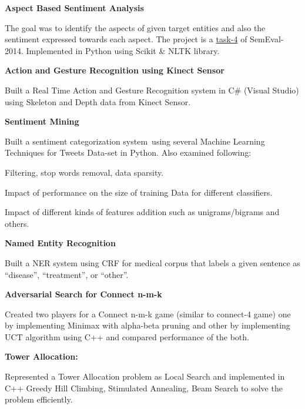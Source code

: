\documentclass[10pt]{article} %
\begin{document}
\begin{itemize}
	
	{\item  \bf Aspect Based Sentiment Analysis\\} The goal was to identify the aspects of given target entities and also the 		sentiment 		expressed towards each aspect. The project is a \href {http://alt.qcri.org/semeval2014/task4/}{task-4} of SemEval-2014. Implemented in Python using Scikit \& NLTK library. 
	

	{\item  \bf Action and Gesture Recognition using Kinect Sensor\\}	
	Built a Real Time Action and Gesture Recognition system in C\# (Visual Studio) using Skeleton and Depth data from Kinect Sensor. 
	

	{\item \bf Sentiment Mining\\} 
	Built a sentiment categorization system using several Machine Learning Techniques for Tweets Data-set in Python. Also examined following:
	\begin{compactitem}
	\item Filtering, stop words removal, data sparsity.
	\item Impact of performance on the size of training Data for different classifiers.
	\item Impact of different kinds of features addition such as unigrams/bigrams and others.
	\end{compactitem}
	
	{\item  \bf Named Entity Recognition\\}
	Built a NER system using CRF for medical corpus that labels a given sentence as “disease”, “treatment”, or “other”.
	
	{\item  \bf Adversarial Search for Connect n-m-k\\} Created two players for a Connect n-m-k game (similar to connect-4 game) one by 		implementing Minimax with alpha-beta pruning and other by implementing UCT algorithm using C++ and compared performance of the both. 
	
	{\item  \bf Tower Allocation:\\}
	Represented a Tower Allocation problem as Local Search and implemented in C++ Greedy Hill Climbing, Stimulated Annealing, Beam Search to solve the problem efficiently.


\end{itemize}
\end{document}
